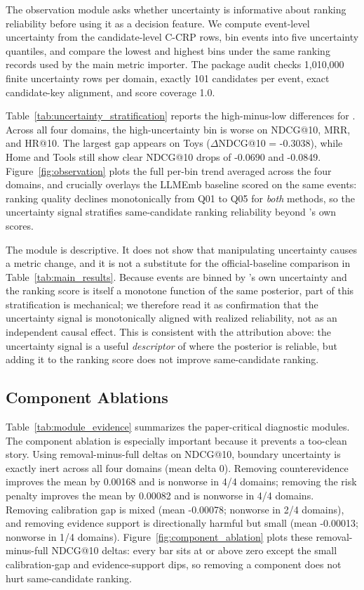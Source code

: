 The observation module asks whether \method{} uncertainty is informative about
ranking reliability before using it as a decision feature. We compute
event-level uncertainty from the candidate-level C-CRP rows, bin events into
five uncertainty quantiles, and compare the lowest and highest bins under the
same ranking records used by the main metric importer. The package audit checks
1,010,000 finite uncertainty rows per domain, exactly 101 candidates per event,
exact candidate-key alignment, and score coverage 1.0.

Table~\ref{tab:uncertainty_stratification} reports the high-minus-low
differences for \method{}. Across all four domains, the high-uncertainty bin is
worse on NDCG@10, MRR, and HR@10. The largest gap appears on Toys
($\Delta$NDCG@10 = -0.3038), while Home and Tools still show clear NDCG@10
drops of -0.0690 and -0.0849. Figure~\ref{fig:observation} plots the full
per-bin trend averaged across the four domains, and crucially overlays the
LLMEmb baseline scored on the same events: ranking quality declines
monotonically from Q01 to Q05 for \emph{both} methods, so the uncertainty signal
stratifies same-candidate ranking reliability beyond \method{}'s own scores.

The module is descriptive. It does not show that manipulating uncertainty
causes a metric change, and it is not a substitute for the official-baseline
comparison in Table~\ref{tab:main_results}. Because events are binned by
\method{}'s own uncertainty and the ranking score is itself a monotone function
of the same posterior, part of this stratification is mechanical; we
therefore read it as confirmation that the uncertainty signal is monotonically
aligned with realized reliability, not as an independent causal effect. This is
consistent with the attribution above: the uncertainty signal is a useful
\emph{descriptor} of where the posterior is reliable, but adding it to the
ranking score does not improve same-candidate ranking.



\subsection{Component Ablations}

Table~\ref{tab:module_evidence} summarizes the paper-critical diagnostic
modules. The component ablation is especially important because it prevents a
too-clean story. Using removal-minus-full deltas on NDCG@10, boundary
uncertainty is exactly inert across all four domains (mean delta 0). Removing
counterevidence improves the mean by 0.00168 and is nonworse in 4/4 domains;
removing the risk penalty improves the mean by 0.00082 and is nonworse in 4/4
domains. Removing calibration gap is mixed (mean -0.00078; nonworse in 2/4
domains), and removing evidence support is directionally harmful but small
(mean -0.00013; nonworse in 1/4 domains). Figure~\ref{fig:component_ablation}
plots these removal-minus-full NDCG@10 deltas: every bar sits at or above zero
except the small calibration-gap and evidence-support dips, so removing a
component does not hurt same-candidate ranking.

